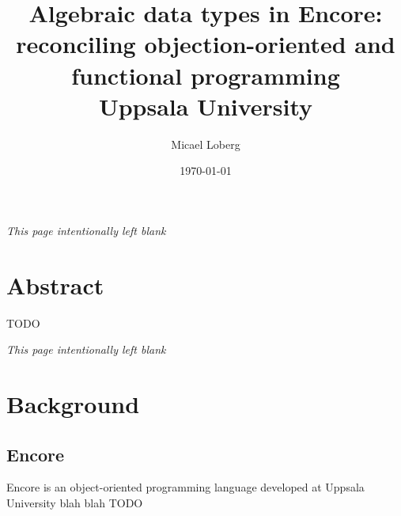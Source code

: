 \documentclass[10pt]{report}
\title{
    {Algebraic data types in Encore:}\\
    {reconciling objection-oriented and functional programming}\\
    {Uppsala University}
}
\author{Micael Loberg}
\date{\today}
\begin{document}

\maketitle

\newpage\newpage
{\centering \textit{This page intentionally left blank}\par}
\vspace{\fill}


\chapter*{Abstract}
TODO

\newpage\newpage
{\centering \textit{This page intentionally left blank}\par}
\vspace{\fill}


\tableofcontents

%
\chapter{Background}
%
\setcounter{page}{1}

%
\label{ch:background}
%

\section{Encore}
Encore is an object-oriented programming language developed at Uppsala University blah blah
TODO
\end{document}
